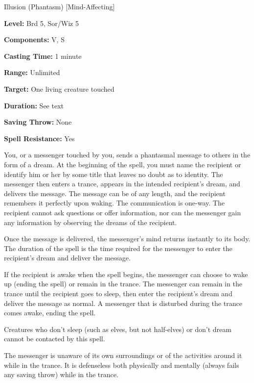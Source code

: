 
Illusion (Phantasm) [Mind-Affecting]

\textbf{Level:} Brd 5, Sor/Wiz 5

\textbf{Components:} V, S

\textbf{Casting Time:} 1 minute

\textbf{Range:} Unlimited

\textbf{Target:} One living creature touched

\textbf{Duration:} See text

\textbf{Saving Throw:} None

\textbf{Spell Resistance:} Yes

You, or a messenger touched by you, sends a phantasmal message to others in the 
form of a dream. At the beginning of the spell, you must name the recipient or 
identify him or her by some title that leaves no doubt as to identity. The messenger 
then enters a trance, appears in the intended recipient's dream, and delivers the 
message. The message can be of any length, and the recipient remembers it perfectly 
upon waking. The communication is one-way. The recipient cannot ask questions or 
offer information, nor can the messenger gain any information by observing the 
dreams of the recipient.

Once the message is delivered, the messenger's mind returns instantly to its body. 
The duration of the spell is the time required for the messenger to enter the recipient's 
dream and deliver the message.

If the recipient is awake when the spell begins, the messenger can choose to wake 
up (ending the spell) or remain in the trance. The messenger can remain in the 
trance until the recipient goes to sleep, then enter the recipient's dream and 
deliver the message as normal. A messenger that is disturbed during the trance 
comes awake, ending the spell.

Creatures who don't sleep (such as elves, but not half-elves) or don't dream cannot 
be contacted by this spell.

The messenger is unaware of its own surroundings or of the activities around it 
while in the trance. It is defenseless both physically and mentally (always fails 
any saving throw) while in the trance.

